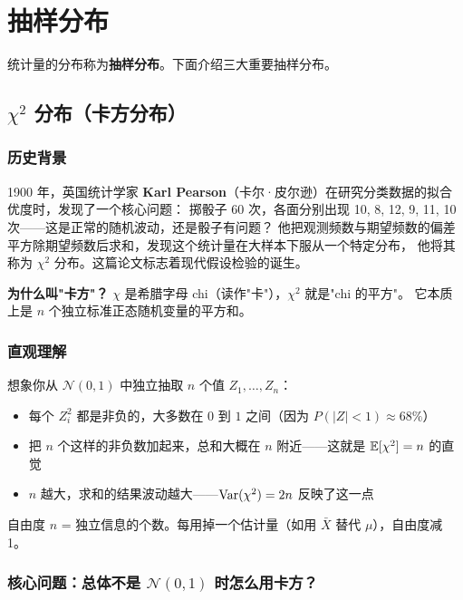 \section{抽样分布}

统计量的分布称为\textbf{抽样分布}。下面介绍三大重要抽样分布。

\subsection{$\chi^2$ 分布（卡方分布）}

\subsubsection{历史背景}

1900 年，英国统计学家 \textbf{Karl Pearson}（卡尔·皮尔逊）在研究分类数据的拟合优度时，发现了一个核心问题：
掷骰子 60 次，各面分别出现 10, 8, 12, 9, 11, 10 次——这是正常的随机波动，还是骰子有问题？
他把观测频数与期望频数的偏差平方除期望频数后求和，发现这个统计量在大样本下服从一个特定分布，
他将其称为 $\chi^2$ 分布。这篇论文标志着现代假设检验的诞生。

\textbf{为什么叫"卡方"？} $\chi$ 是希腊字母 chi（读作"卡"），$\chi^2$ 就是"chi 的平方"。
它本质上是 $n$ 个独立标准正态随机变量的平方和。

\subsubsection{直观理解}

想象你从 $\mathcal{N}(0,1)$ 中独立抽取 $n$ 个值 $Z_1, \dots, Z_n$：
\begin{itemize}
    \item 每个 $Z_i^2$ 都是非负的，大多数在 $0$ 到 $1$ 之间（因为 $P(|Z|<1) \approx 68\%$）
    \item 把 $n$ 个这样的非负数加起来，总和大概在 $n$ 附近——这就是 $\mathbb{E}[\chi^2] = n$ 的直觉
    \item $n$ 越大，求和的结果波动越大——$\mathrm{Var}(\chi^2) = 2n$ 反映了这一点
\end{itemize}

自由度 $n$ = 独立信息的个数。每用掉一个估计量（如用 $\bar{X}$ 替代 $\mu$），自由度减 1。

\subsubsection{核心问题：总体不是 $\mathcal{N}(0,1)$ 时怎么用卡方？}

